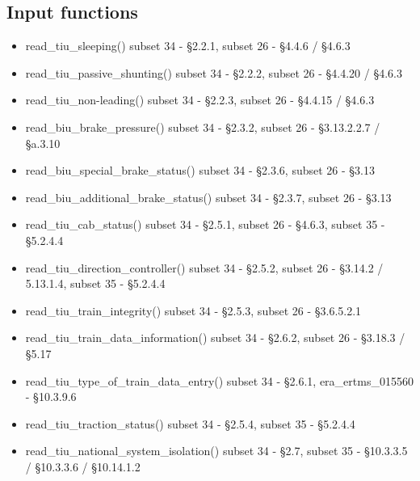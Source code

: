 \documentclass{template/openetcs_article}
\begin{document}
	\subsection{Input functions}
		\begin{itemize}
			\item read\_tiu\_sleeping()
				\subitem subset 34 - §2.2.1, subset 26 - §4.4.6 / §4.6.3
			\item read\_tiu\_passive\_shunting()
				\subitem subset 34 - §2.2.2, subset 26 - §4.4.20 / §4.6.3
			\item read\_tiu\_non-leading()
				\subitem subset 34 - §2.2.3, subset 26 - §4.4.15 / §4.6.3
			\item read\_biu\_brake\_pressure()
				\subitem subset 34 - §2.3.2, subset 26 - §3.13.2.2.7 / §a.3.10
			\item read\_biu\_special\_brake\_status()
				\subitem subset 34 - §2.3.6, subset 26 - §3.13
			\item read\_biu\_additional\_brake\_status()
				\subitem subset 34 - §2.3.7, subset 26 - §3.13
			\item read\_tiu\_cab\_status()
				\subitem subset 34 - §2.5.1, subset 26 - §4.6.3, subset 35 - §5.2.4.4
			\item read\_tiu\_direction\_controller()
				\subitem subset 34 - §2.5.2, subset 26 - §3.14.2 / 5.13.1.4, subset 35 - §5.2.4.4
			\item read\_tiu\_train\_integrity()
				\subitem subset 34 - §2.5.3, subset 26 - §3.6.5.2.1
			\item read\_tiu\_train\_data\_information()
				\subitem subset 34 - §2.6.2, subset 26 - §3.18.3 / §5.17
			\item read\_tiu\_type\_of\_train\_data\_entry()
				\subitem subset 34 - §2.6.1, era\_ertms\_015560 - §10.3.9.6
			\item read\_tiu\_traction\_status()
				\subitem subset 34 - §2.5.4, subset 35 - §5.2.4.4
			\item read\_tiu\_national\_system\_isolation()
				\subitem subset 34 - §2.7, subset 35 - §10.3.3.5 / §10.3.3.6 / §10.14.1.2
		\end{itemize}
\end{document}
